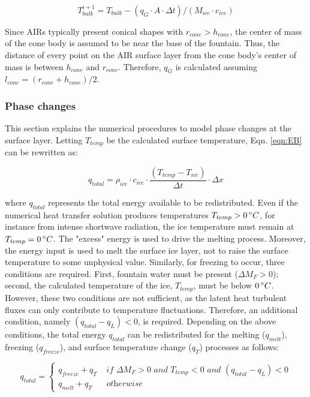 \begin{equation} T_{bulk}^{i+1} = T_{bulk} - (q_{G} \cdot A \cdot \Delta t)/(M_{ice} \cdot c_{ice}) \end{equation}

Since \ac{AIRs} typically present conical shapes with $r_{cone} > h_{cone}$, the center of mass of the cone body is
assumed to be near the base of the fountain. Thus, the distance of every point on the \ac{AIR} surface layer from the
cone body's center of mass is between $h_{cone}$ and $r_{cone}$. Therefore, $q_{G}$ is calculated assuming
$l_{cone} = (r_{cone} + h_{cone})/2$.

\subsubsection{Phase changes} \label{sec:phase}

This section explains the numerical procedures to model phase changes at the surface layer. Letting
$T_{temp}$ be the calculated surface temperature, Eqn. \ref{eqn:EB} can be rewritten as:

$$q_{total} =\rho_{ice} \cdot c_{ice} \cdot \frac{(T_{temp}-T_{ice})}{\Delta t} \cdot \Delta x$$

where $q_{total}$ represents the total energy available to be redistributed. Even if the numerical heat transfer
solution produces temperatures $T_{temp}>0\, ^{\circ} C$, for instance from intense shortwave radiation, the ice
temperature must remain at $T_{temp} = 0\, ^{\circ} C$. The "excess" energy is used to drive the melting
process. Moreover, the energy input is used to melt the surface ice layer, not to raise the surface
temperature to some unphysical value. Similarly, for freezing to occur, three conditions are required. First,
fountain water must be present ($\Delta M_{F} > 0 $); second, the calculated temperature of the ice, $T_{temp}$,
must be below $0\, ^{\circ} C$. However, these two conditions are not sufficient, as the latent heat turbulent fluxes
can only contribute to temperature fluctuations. Therefore, an additional condition, namely $(q_{total}-q_{L})
	< 0$, is required. Depending on the above conditions, the total energy $q_{total}$ can be redistributed
for the melting ($q_{melt}$), freezing ($q_{freeze}$), and surface temperature change ($q_{T}$) processes as
follows:

\begin{equation}
	q_{total} = \left\{ \begin{array}{ll}
		q_{freeze} + q_{T} & \textit{ if } \Delta M_{F} > 0 \textit{ and } T_{temp} < 0 \textit{ and }(q_{total}-q_{L}) < 0 \\
		q_{melt} + q_{T}   & \textit{ otherwise}
	\end{array} \right.
\end{equation}

